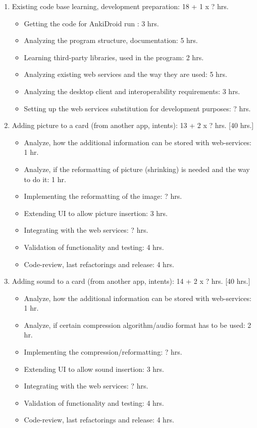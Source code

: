 \documentclass[a4paper,11pt,twoside]{article}
\begin{document}
\begin{enumerate}
 \item Existing code base learning, development preparation: 18 + 1 x ? hrs.
       \begin{itemize}
        \item Getting the code for AnkiDroid run : 3 hrs.
        \item Analyzing the program structure, documentation: 5 hrs.
        \item Learning third-party libraries, used in the program: 2 hrs.
        \item Analyzing existing web services and the way they are used: 5 hrs.
        \item Analyzing the desktop client and interoperability requirements: 3 hrs.
        \item Setting up the web services substitution for development purposes: ? hrs.        
       \end{itemize}

\item Adding picture to a card (from another app, intents): 13 + 2 x ? hrs. [40 hrs.]
      \begin{itemize}
       \item Analyze, how the additional information can be stored with web-services: 1 hr.
       \item Analyze, if the reformatting of picture (shrinking) is needed and the way to do it: 1 hr.
       \item Implementing the reformatting of the image: ? hrs.
       \item Extending UI to allow picture insertion: 3 hrs.
       \item Integrating with the web services: ? hrs.
       \item Validation of functionality and testing: 4 hrs.
       \item Code-review, last refactorings and release: 4 hrs.
      \end{itemize}
      
 \item Adding sound to a card (from another app, intents): 14 + 2 x ? hrs. [40 hrs.]
      \begin{itemize}
       \item Analyze, how the additional information can be stored with web-services: 1 hr.
       \item Analyze, if certain compression algorithm/audio format has to be used: 2 hr.
       \item Implementing the compression/reformatting: ? hrs.
       \item Extending UI to allow sound insertion: 3 hrs.
       \item Integrating with the web services: ? hrs.
       \item Validation of functionality and testing: 4 hrs.
       \item Code-review, last refactorings and release: 4 hrs.
      \end{itemize}


\end{enumerate}
\end{document}
